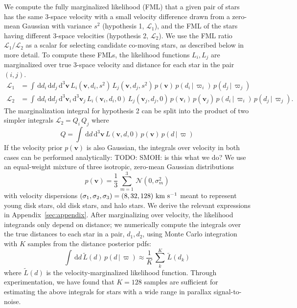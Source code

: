 \documentclass[manuscript, letterpaper]{aastex6}
\newcommand{\given}{\,|\,}
\newcommand{\dd}{\mathrm{d}}
\newcommand{\bs}[1]{\boldsymbol{#1}}
\newcommand{\kms}{\rm km~s^{-1}}
\newcommand{\todo}[1]{{\color{red}TODO: #1}}
\begin{document}
We compute the fully marginalized likelihood (FML) that a given pair of stars
has the same 3-space velocity with a small velocity difference drawn from a
zero-mean Gaussian with variance $s^2$ (hypothesis 1, $\mathcal{L}_1$), and
the FML of the stars having different 3-space velocities (hypothesis 2,
$\mathcal{L}_2$).
We use the FML ratio $\mathcal{L}_1/\mathcal{L}_2$ as a scalar for selecting
candidate co-moving stars, as described below in more detail.
To compute these FMLs, the likelihood functions $L_i, L_j$ are marginalized
over true 3-space velocity and distance for each star in the pair $(i,j)$.
\begin{align}
  \mathcal{L}_1 &=
    \int \, \dd d_i \, \dd d_j \, \dd^3 \bs{v} \,
    L_i(\bs{v}, d_i, s^2) \,
    L_j(\bs{v}, d_j, s^2) \,
    p(\bs{v}) \, p(d_i \given \varpi_i) \, p(d_j \given \varpi_j) \\
  \mathcal{L}_2 &=
    \int \, \dd d_i \, \dd d_j \, \dd^3 \bs{v}_i \, \dd^3 \bs{v}_j \,
    L_i(\bs{v}_i, d_i, 0) \,
    L_j(\bs{v}_j, d_j, 0) \,
    p(\bs{v}_i) \, p(\bs{v}_j) \, p(d_i \given \varpi_i) \, p(d_j \given \varpi_j). \label{eq:hyp2}
\end{align}
The marginalization integral for hypothesis 2 can be split into the product of
two simpler integrals $\mathcal{L}_2 = Q_i \, Q_j$ where
\begin{equation}
  Q = \int \, \dd d \, \dd^3 \bs{v} \, L(\bs{v}, d, 0) \, p(\bs{v}) \, p(d\given\varpi)
\end{equation}
If the velocity prior $p(\bs{v})$ is also Gaussian, the integrals over velocity
in both cases can be performed analytically:
\todo{SMOH: is this what we do?}
We use an equal-weight mixture of three isotropic, zero-mean Gaussian
distributions
\begin{equation}
  p(\bs{v}) = \frac{1}{3} \, \sum_{m=1}^3 \, \mathcal{N}(0, \sigma_m^2)
\end{equation}
with velocity dispersions $(\sigma_1, \sigma_2, \sigma_3) = (8, 32, 128)~\kms$
meant to represent young disk stars, old disk stars, and halo stars.
We derive the relevant expressions in Appendix~\ref{sec:appendix}.
After marginalizing over velocity, the likelihood integrands only depend on
distance; we numerically compute the integrals over the true distances to each
star in a pair, $d_1,d_2$, using Monte Carlo integration with $K$ samples from
the distance posterior pdfs:
\begin{equation}
  \int \, \dd d \, \tilde{L}(d) \, p(d\given\varpi) \approx
    \frac{1}{K} \, \sum_k^K \, \tilde{L}(d_k)
\end{equation}
where $\tilde{L}(d)$ is the velocity-marginalized likelihood function.
Through experimentation, we have found that $K=128$ samples are sufficient for
estimating the above integrals for stars with a wide range in parallax
signal-to-noise.
\end{document}
